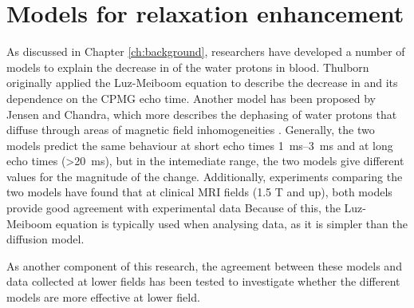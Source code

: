 \chapter{Models for \Ttwo relaxation enhancement}\label{ch:models}

As discussed in Chapter \ref{ch:background}, researchers have developed a number of models to explain the decrease in \Ttwo of the water protons in blood.
Thulborn originally applied the Luz-Meiboom equation to describe the decrease in \Ttwo and its dependence on the CPMG echo time\cite{ThulbornOxygenationdependencetransverse1982}.
Another model has been proposed by Jensen and Chandra, which more describes the dephasing of water protons that diffuse through areas of magnetic field inhomogeneities \cite{JensenNMRrelaxationtissues2000}.
Generally, the two models predict the same behaviour at short echo times \SIrange{1}{3}{ms} and at long echo times (\SI{>20}{ms})\cite{BrooksT2shorteningweaklymagnetized2001}, but in the intemediate range, the two models give different values for the magnitude of the \Ttwo change.
Additionally, experiments comparing the two models have found that at clinical MRI fields (1.5 T and up), both models provide good agreement with experimental data \cite{StefanovicHumanwholebloodrelaxometry2004,ChenHumanwholeblood2009,GardenerDependencebloodR22010,GrgacTransversewaterrelaxation2017}
Because of this, the Luz-Meiboom equation is typically used when analysing data, as it is simpler than the diffusion model.

As another component of this research, the agreement between these models and data collected at lower fields has been tested to investigate whether the different models are more effective at lower field.

